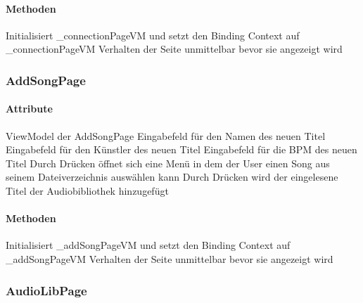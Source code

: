 \documentclass[../entwurf.tex]{subfiles}
\begin{document}
\paragraph{Methoden}
\begin{itemize}
	 Initialisiert \_connectionPageVM und setzt den Binding Context 			auf \_connectionPageVM
	 Verhalten der Seite unmittelbar bevor sie angezeigt wird
\end{itemize}

\subsubsection{AddSongPage}

\paragraph{Attribute}
\begin{itemize}
	 ViewModel der AddSongPage
	 Eingabefeld für den Namen des neuen Titel
	 Eingabefeld für den Künstler des neuen Titel
	 Eingabefeld für die BPM des neuen Titel
	 Durch Drücken öffnet sich eine Menü in dem der User einen Song aus seinem Dateiverzeichnis auswählen kann
	 Durch Drücken wird der eingelesene Titel der Audiobibliothek hinzugefügt 	
\end{itemize}

\paragraph{Methoden}
\begin{itemize}
	 Initialisiert \_addSongPageVM und setzt den Binding Context 			auf \_addSongPageVM
	 Verhalten der Seite unmittelbar bevor sie angezeigt wird
\end{itemize}

\subsubsection{AudioLibPage}
\end{document}
